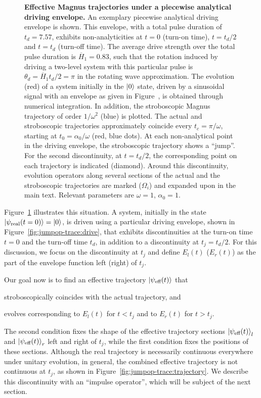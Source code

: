 \begin{figure}[tb]
	\caption{\textbf{Effective Magnus trajectories under a piecewise analytical driving envelope.}  An exemplary piecewise analytical driving envelope is shown. This envelope, with a total pulse duration of $t_d = 7.57$, exhibits non-analyticities at $t=0$ (turn-on time), $t=t_d/2$ and $t=t_d$ (turn-off time). The average drive strength over the total pulse duration is $\overline{H}_1 = 0.83$, such that the rotation induced by driving a two-level system with this particular pulse is $\theta_d = \overline{H}_1t_d/2=\pi$ in the rotating wave approximation.  The evolution (red) of a system initially in the $\ket{0}$ state, driven by a sinusoidal signal with an envelope as given in Figure~, is obtained through numerical integration. In addition, the stroboscopic Magnus trajectory of order $1/\omega^2$ (blue) is plotted. The actual and stroboscopic trajectories approximately coincide every $t_c=\pi / \omega$, starting at $t_0 = \alpha_0/\omega$ (red, blue dots). At each non-analytical point in the driving envelope, the stroboscopic trajectory shows a ``jump''. For the second discontinuity, at $t = t_d/2$, the corresponding point on each trajectory is indicated (diamond). Around this discontinuity, evolution operators along several sections of the actual and the stroboscopic trajectories are marked ($\Omega_i$) and expanded upon in the main text. Relevant parameters are $\omega = 1$, $\alpha_0 = 1$. }
	\label{fig:jumpop-trace}
\end{figure}

Figure~\ref{fig:jumpop-trace} illustrates this situation. A system, initially in the state $\ket{\psi_{\text{real}}(t=0)}=\ket{0}$, is driven using a particular driving envelope, shown in Figure~\ref{fig:jumpop-trace:drive}, that exhibits discontinuities at the turn-on time $t=0$ and the turn-off time $t_d$, in addition to a discontinuity at $t_j = t_d/2$. For this discussion, we focus on the discontinuity at $t_j$ and define $E_l(t)$ ($E_r(t)$) as the part of the envelope function left (right) of $t_j$. 

Our goal now is to find an effective trajectory $\ket{\psi_{\text{eff}}(t)}$ that 
\begin{enumerate*}[label=(\alph*)]
	\item stroboscopically coincides with the actual trajectory, and
	\item evolves corresponding to $E_l(t)$ for $t<t_j$ and to $E_r(t)$ for $t>t_j$.
\end{enumerate*} 
The second condition fixes the shape of the effective trajectory sections $\ket{\psi_{\text{eff}}(t)}_l $ and $\ket{\psi_{\text{eff}}(t)}_r$ left and right of $t_j$, while the first condition fixes the positions of these sections. Although the real trajectory is necessarily continuous everywhere under unitary evolution, in general, the combined effective trajectory is not continuous at $t_j$, as shown in Figure~\ref{fig:jumpop-trace:trajectory}. We describe this discontinuity with an ``impulse operator'', which will be subject of the next section.

